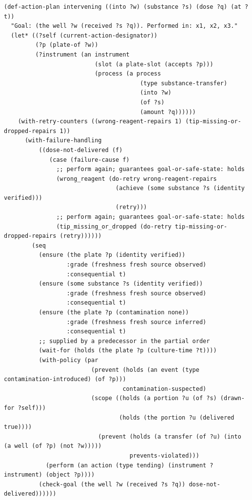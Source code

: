 \documentclass[10pt,a4paper]{article}
\begin{document}
\begin{listing}[tbp]
\begin{Verbatim}[fontsize=\footnotesize,breaklines,frame=lines,framesep=2mm]
(def-action-plan intervening ((into ?w) (substance ?s) (dose ?q) (at ?t))
  "Goal: (the well ?w (received ?s ?q)). Performed in: x1, x2, x3."
  (let* ((?self (current-action-designator))
         (?p (plate-of ?w))
         (?instrument (an instrument
                          (slot (a plate-slot (accepts ?p)))
                          (process (a process
                                       (type substance-transfer)
                                       (into ?w)
                                       (of ?s)
                                       (amount ?q))))))
    (with-retry-counters ((wrong-reagent-repairs 1) (tip-missing-or-dropped-repairs 1))
      (with-failure-handling
          ((dose-not-delivered (f)
             (case (failure-cause f)
               ;; perform again; guarantees goal-or-safe-state: holds
               (wrong_reagent (do-retry wrong-reagent-repairs
                                (achieve (some substance ?s (identity verified)))
                                (retry)))
               ;; perform again; guarantees goal-or-safe-state: holds
               (tip_missing_or_dropped (do-retry tip-missing-or-dropped-repairs (retry))))))
        (seq
          (ensure (the plate ?p (identity verified))
                  :grade (freshness fresh source observed)
                  :consequential t)
          (ensure (some substance ?s (identity verified))
                  :grade (freshness fresh source observed)
                  :consequential t)
          (ensure (the plate ?p (contamination none))
                  :grade (freshness fresh source inferred)
                  :consequential t)
          ;; supplied by a predecessor in the partial order
          (wait-for (holds (the plate ?p (culture-time ?t))))
          (with-policy (par
                         (prevent (holds (an event (type contamination-introduced) (of ?p)))
                                  contamination-suspected)
                         (scope ((holds (a portion ?u (of ?s) (drawn-for ?self)))
                                 (holds (the portion ?u (delivered true))))
                           (prevent (holds (a transfer (of ?u) (into (a well (of ?p) (not ?w)))))
                                    prevents-violated)))
            (perform (an action (type tending) (instrument ?instrument) (object ?p))))
          (check-goal (the well ?w (received ?s ?q)) dose-not-delivered))))))
\end{Verbatim}
\caption{The generated CRAM/RPL plan for the lab action type \texttt{intervening}.}\label{lst:cram}
\end{listing}
\end{document}
